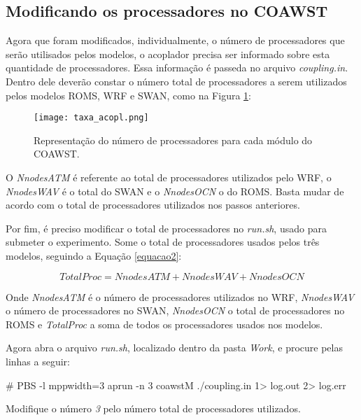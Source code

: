 \subsection{Modificando os processadores no COAWST}
\bigskip

\noindent Agora que foram modificados, individualmente, o número de processadores que serão utilisados pelos modelos, o acoplador precisa ser informado sobre esta quantidade de processadores. Essa informação é passeda no arquivo \textit{coupling.in}. Dentro dele deverão constar o número total de processadores a serem utilizados pelos modelos ROMS, WRF e SWAN, como na Figura \textcolor{bleu_cite}{\ref{procscoa}}:
\bigskip

\begin{figure}[H]
    \centering
    \texttt{[image: taxa\_acopl.png]}
    \caption{Representação do número de processadores para cada módulo do COAWST.}
    \label{procscoa}
\end{figure}
\bigskip

\noindent O \textit{NnodesATM} é referente ao total de processadores utilizados pelo WRF, o \textit{NnodesWAV} é o total do SWAN e o \textit{NnodesOCN} o do ROMS. Basta mudar de acordo com o total de processadores utilizados nos passos anteriores.
\bigskip

\noindent Por fim, é preciso modificar o total de processadores no \textit{run.sh}, usado para submeter o experimento. Some o total de processadores usados pelos três modelos, seguindo a Equação \textcolor{bleu_cite}{\ref{equacao2}}:
\bigskip

\begin{equation}
TotalProc = NnodesATM + NnodesWAV + NnodesOCN
\label{equacao2}
\end{equation}
\bigskip

\noindent Onde  \textit{NnodesATM} é o número de processadores utilizados no WRF, \textit{NnodesWAV} o número de processadores no SWAN, \textit{NnodesOCN} o total de processadores no ROMS e \textit{TotalProc} a soma de todos os processadores usados nos modelos.
\bigskip

\noindent Agora abra o arquivo \textit{run.sh}, localizado dentro da pasta \textit{Work}, e procure pelas linhas a seguir:
\bigskip

\begin{bashcode}
\# PBS -l mppwidth=3
aprun -n 3 coawstM ./coupling.in 1> log.out 2> log.err
\end{bashcode}
\bigskip

\noindent Modifique o número \textit{3} pelo número total de processadores utilizados.
\bigskip

